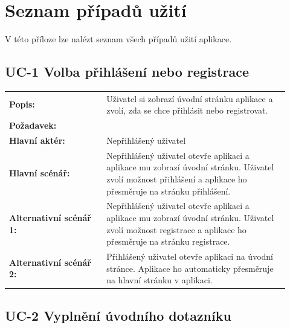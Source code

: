 ﻿%
\chapter{Seznam případů užití}\label{chapter:use-case-list}

V této příloze lze nalézt seznam všech případů užití aplikace.

\section{UC-1 Volba přihlášení nebo registrace}\label{sec:uc-1}

\begin{tabular}{p{0.32\linewidth}p{0.6\linewidth}}
  \textbf{Popis:} & Uživatel si zobrazí úvodní stránku aplikace a zvolí, zda se chce přihlásit nebo registrovat. \\
  \textbf{Požadavek:} & \nameref{sec:fp-welcome-page} \\
  \textbf{Hlavní aktér:} & Nepřihlášený uživatel \\
  \textbf{Hlavní scénář:} & Nepřihlášený uživatel otevře aplikaci a aplikace mu zobrazí úvodní stránku. Uživatel zvolí možnost přihlášení a aplikace ho přesměruje na stránku přihlášení. \\
  \textbf{Alternativní scénář 1:} & Nepřihlášený uživatel otevře aplikaci a aplikace mu zobrazí úvodní stránku. Uživatel zvolí možnost registrace a aplikace ho přesměruje na stránku registrace. \\
  \textbf{Alternativní scénář 2:} & Přihlášený uživatel otevře aplikaci na úvodní stránce. Aplikace ho automaticky přesměruje na hlavní stránku v aplikaci. \\
\end{tabular}

\section{UC-2 Vyplnění úvodního dotazníku}\label{sec:uc-2}

